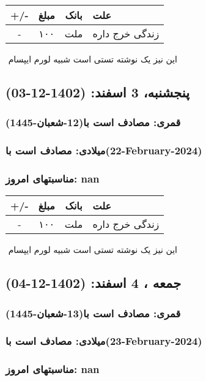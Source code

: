 \documentclass{article}
\newcommand{\rnote}[1]{\marginpar{\textcolor{color}{\StrSubstitute{\##1}{ }{\_}}}}
\newcommand{\myRow}[4]{
    #1 & #2 & #3 & #4 \\ \hline
}
\begin{document}
\begin{tabular}{ | c | c | c | p{5cm} |}
    \hline
    \myRow{ +/- }{مبلغ}{بانک}{علت}
    \myRow{-}{۱۰۰}{ملت}{زندگی خرج داره}
\end{tabular}
\newline
\newline

‌
\rnote{تست}
این نیز یک نوشته تستی است شبیه لورم ایپسام




\newpage
{}
\textcolor{color}{
\section{ پنجشنبه، 3 اسفند: (1402-12-03) }
\subsubsection*{قمری: مصادف است با(12-شعبان-1445)} 
\subsubsection*{میلادی: مصادف است با(22-February-2024)}
\subsubsection*{مناسبتهای امروز: nan}
}


\begin{tabular}{ | c | c | c | p{5cm} |}
    \hline
    \myRow{ +/- }{مبلغ}{بانک}{علت}
    \myRow{-}{۱۰۰}{ملت}{زندگی خرج داره}
\end{tabular}
\newline
\newline

‌
\rnote{تست}
این نیز یک نوشته تستی است شبیه لورم ایپسام




\newpage
{}
\textcolor{color}{
\section{ جمعه ، 4 اسفند: (1402-12-04) }
\subsubsection*{قمری: مصادف است با(13-شعبان-1445)} 
\subsubsection*{میلادی: مصادف است با(23-February-2024)}
\subsubsection*{مناسبتهای امروز: nan}
}
\end{document}

